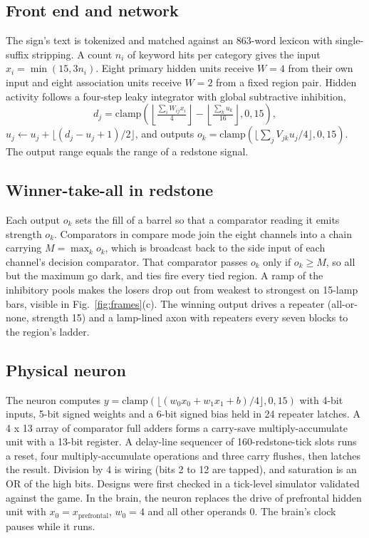 \documentclass[conference]{IEEEtran}
\begin{document}
\subsection{Front end and network}
The sign's text is tokenized and matched against an 863-word lexicon with single-suffix stripping. A count $n_i$ of keyword hits per category gives the input $x_i = \min(15, 3n_i)$. Eight primary hidden units receive $W = 4$ from their own input and eight association units receive $W = 2$ from a fixed region pair. Hidden activity follows a four-step leaky integrator with global subtractive inhibition,
\begin{equation}
d_j = \mathrm{clamp}\!\left(\left\lfloor \tfrac{\sum_i W_{ij} x_i}{4} \right\rfloor - \left\lfloor \tfrac{\sum_k u_k}{16} \right\rfloor, 0, 15\right),
\end{equation}
$u_j \leftarrow u_j + \lfloor (d_j - u_j + 1)/2 \rfloor$, and outputs $o_k = \mathrm{clamp}(\lfloor \sum_j V_{jk} u_j / 4 \rfloor, 0, 15)$. The output range equals the range of a redstone signal.

\subsection{Winner-take-all in redstone}
Each output $o_k$ sets the fill of a barrel so that a comparator reading it emits strength $o_k$. Comparators in compare mode join the eight channels into a chain carrying $M = \max_k o_k$, which is broadcast back to the side input of each channel's decision comparator. That comparator passes $o_k$ only if $o_k \ge M$, so all but the maximum go dark, and ties fire every tied region. A ramp of the inhibitory pools makes the losers drop out from weakest to strongest on 15-lamp bars, visible in Fig.~\ref{fig:frames}(c). The winning output drives a repeater (all-or-none, strength 15) and a lamp-lined axon with repeaters every seven blocks to the region's ladder.

\subsection{Physical neuron}
The neuron computes $y = \mathrm{clamp}(\lfloor (w_0 x_0 + w_1 x_1 + b)/4 \rfloor, 0, 15)$ with 4-bit inputs, 5-bit signed weights and a 6-bit signed bias held in 24 repeater latches. A 4 x 13 array of comparator full adders forms a carry-save multiply-accumulate unit with a 13-bit register. A delay-line sequencer of 160-redstone-tick slots runs a reset, four multiply-accumulate operations and three carry flushes, then latches the result. Division by 4 is wiring (bits 2 to 12 are tapped), and saturation is an OR of the high bits. Designs were first checked in a tick-level simulator validated against the game. In the brain, the neuron replaces the drive of prefrontal hidden unit with $x_0 = x_{\mathrm{prefrontal}}$, $w_0 = 4$ and all other operands 0. The brain's clock pauses while it runs.
\end{document}
